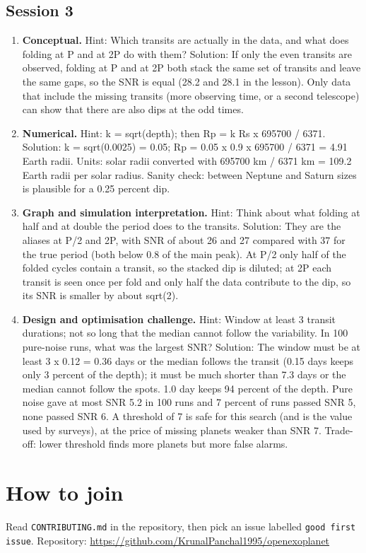 \documentclass[11pt,a4paper]{article}
\begin{document}
\subsection*{Session 3}
\begin{enumerate}[nosep]
\item \textbf{Conceptual.} Hint: Which transits are actually in the data, and what does folding at P and at 2P do with them? Solution: If only the even transits are observed, folding at P and at 2P both stack the same set of transits and leave the same gaps, so the SNR is equal (28.2 and 28.1 in the lesson). Only data that include the missing transits (more observing time, or a second telescope) can show that there are also dips at the odd times.
\item \textbf{Numerical.} Hint: k = sqrt(depth); then Rp = k Rs x 695700 / 6371. Solution: k = sqrt(0.0025) = 0.05; Rp = 0.05 x 0.9 x 695700 / 6371 = 4.91 Earth radii. Units: solar radii converted with 695700 km / 6371 km = 109.2 Earth radii per solar radius. Sanity check: between Neptune and Saturn sizes is plausible for a 0.25 percent dip.
\item \textbf{Graph and simulation interpretation.} Hint: Think about what folding at half and at double the period does to the transits. Solution: They are the aliases at P/2 and 2P, with SNR of about 26 and 27 compared with 37 for the true period (both below 0.8 of the main peak). At P/2 only half of the folded cycles contain a transit, so the stacked dip is diluted; at 2P each transit is seen once per fold and only half the data contribute to the dip, so its SNR is smaller by about sqrt(2).
\item \textbf{Design and optimisation challenge.} Hint: Window at least 3 transit durations; not so long that the median cannot follow the variability. In 100 pure-noise runs, what was the largest SNR? Solution: The window must be at least 3 x 0.12 = 0.36 days or the median follows the transit (0.15 days keeps only 3 percent of the depth); it must be much shorter than 7.3 days or the median cannot follow the spots. 1.0 day keeps 94 percent of the depth. Pure noise gave at most SNR 5.2 in 100 runs and 7 percent of runs passed SNR 5, none passed SNR 6. A threshold of 7 is safe for this search (and is the value used by surveys), at the price of missing planets weaker than SNR 7. Trade-off: lower threshold finds more planets but more false alarms.
\end{enumerate}

\section{How to join}
Read \texttt{CONTRIBUTING.md} in the repository, then pick an issue labelled \texttt{good first issue}. Repository: \url{https://github.com/KrunalPanchal1995/openexoplanet}
\end{document}
